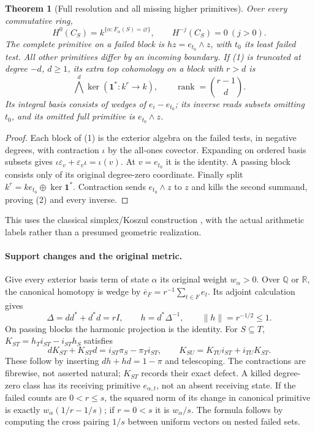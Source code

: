 \documentclass[10pt,a4paper]{article}
\newtheorem{theorem}{Theorem}
\begin{document}
\begin{theorem}[Full resolution and all missing higher primitives]
Over every commutative ring,
\[
 H^0(C_S)=k^{\{\alpha:F_\alpha(S)=\varnothing\}},\qquad H^{-j}(C_S)=0\ (j>0).
\]
The complete primitive on a failed block is $h z=e_{t_0}\wedge z$, with
$t_0$ its least failed test. All other primitives differ by an incoming
boundary. If (1) is truncated at degree $-d$, $d\ge1$, its extra top
cohomology on a block with $r>d$ is
\[
 \bigwedge^d\ker(\mathbf1^*:k^r\to k),\qquad
 \operatorname{rank}=\binom{r-1}{d}.                       \tag{2}
\]
Its integral basis consists of wedges of $e_i-e_{t_0}$; its inverse reads
subsets omitting $t_0$, and its omitted full primitive is $e_{t_0}\wedge z$.
\end{theorem}
\begin{proof}
Each block of (1) is the exterior algebra on the failed tests, in negative
degrees, with contraction $\iota$ by the all-ones covector. Expanding on
ordered basis subsets gives $\iota\varepsilon_v+\varepsilon_v\iota=\iota(v)$.
At $v=e_{t_0}$ it is the identity. A passing block consists only of its
original degree-zero coordinate. Finally split
$k^r=ke_{t_0}\oplus\ker\mathbf1^*$. Contraction sends $e_{t_0}\wedge z$
to $z$ and kills the second summand, proving (2) and every inverse.
\end{proof}
This uses the classical simplex/Koszul construction \cite{Kos}, with the
actual arithmetic labels rather than a presumed geometric realization.

\newpage
\paragraph{Support changes and the original metric.}
Give every exterior basis term of state $\alpha$ its original weight $w_\alpha>0$.
Over $\mathbb Q$ or $\mathbb R$, the canonical homotopy is wedge by
$\overline e_F=r^{-1}\sum_{t\in F}e_t$. Its adjoint calculation gives
\[
 \Delta=dd^*+d^*d=rI,\qquad h=d^*\Delta^{-1},\qquad\|h\|=r^{-1/2}\le1.
                                                               \tag{3}
\]
On passing blocks the harmonic projection is the identity. For $S\subseteq T$,
$K_{ST}=h_Ti_{ST}-i_{ST}h_S$ satisfies
\[
 dK_{ST}+K_{ST}d=i_{ST}\pi_S-\pi_Ti_{ST},\qquad
 K_{SU}=K_{TU}i_{ST}+i_{TU}K_{ST}.                          \tag{4}
\]
These follow by inserting $dh+hd=1-\pi$ and telescoping. The contractions
are fibrewise, not asserted natural; $K_{ST}$ records their exact defect.
A killed degree-zero class has its receiving primitive $e_{\alpha,t}$,
not an absent receiving state. If the failed counts are $0<r\le s$,
the squared norm of its change in canonical primitive is exactly
$w_\alpha(1/r-1/s)$; if $r=0<s$ it is $w_\alpha/s$.
The formula follows by computing the cross pairing $1/s$ between uniform
vectors on nested failed sets.
\end{document}
